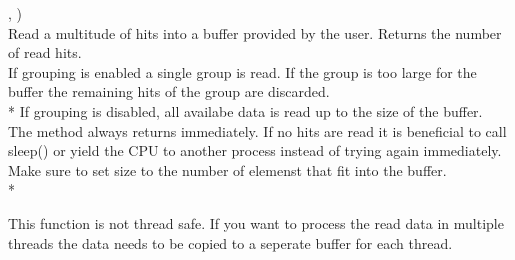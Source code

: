 \device,    )\\
Read a multitude of hits into a buffer provided by the user. Returns the number of read hits.\\
If grouping is enabled a single group is read. 
If the group is too large for the buffer the remaining hits of the group are discarded.\\*
If grouping is disabled, all availabe data is read up to the size of the buffer. \\
The method always returns immediately. If no hits are read it is beneficial to call \textsf{sleep()} 
or yield the CPU to another process instead of trying again immediately.\\
Make sure to set \textsf{size} to the number of elemenst that fit into the buffer.\\*

This function is not thread safe. 
If you want to process the read data in multiple threads the data needs to be copied to a seperate buffer for each thread.

